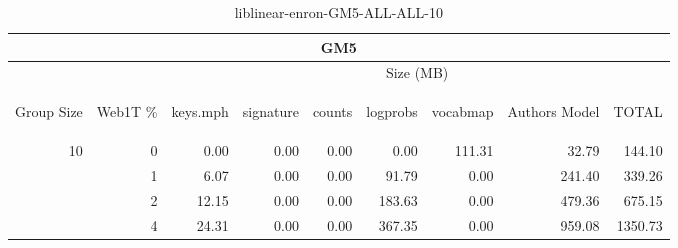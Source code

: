 \begin{center}
\begin{table}[htbp] 
 \begin{center}
\begin{tabular}{ | r | r | r | r | r | r | r | r | r |}
\hline
\multicolumn{9}{|c|}{GM5}\\
\hline
 & & \multicolumn{7}{|c|}{Size (MB)}\\ \cline{3-9}
\begin{sideways}Group Size\end{sideways} & \begin{sideways}Web1T \% \end{sideways} & \begin{sideways}keys.mph\end{sideways} & \begin{sideways}signature\end{sideways} & \begin{sideways}counts\end{sideways} & \begin{sideways}logprobs\end{sideways} & \begin{sideways}vocabmap\end{sideways} & \begin{sideways}Authors Model \end{sideways} & \begin{sideways}TOTAL\end{sideways}\\
\hline
\multirow{3}{*}{10}
 & 0 & 0.00 & 0.00 & 0.00 & 0.00 & 111.31 & 32.79 & 144.10\\ \cline{2-9}
 & 1 & 6.07 & 0.00 & 0.00 & 91.79 & 0.00 & 241.40 & 339.26\\ \cline{2-9}
 & 2 & 12.15 & 0.00 & 0.00 & 183.63 & 0.00 & 479.36 & 675.15\\ \cline{2-9}
 & 4 & 24.31 & 0.00 & 0.00 & 367.35 & 0.00 & 959.08 & 1350.73\\ \cline{2-9}
\hline
\end{tabular}
\caption{liblinear-enron-GM5-ALL-ALL-10}
\label{table:liblinear-enron-GM5-ALL-ALL-10}
\end{center}
 \end{table}
\end{center}

